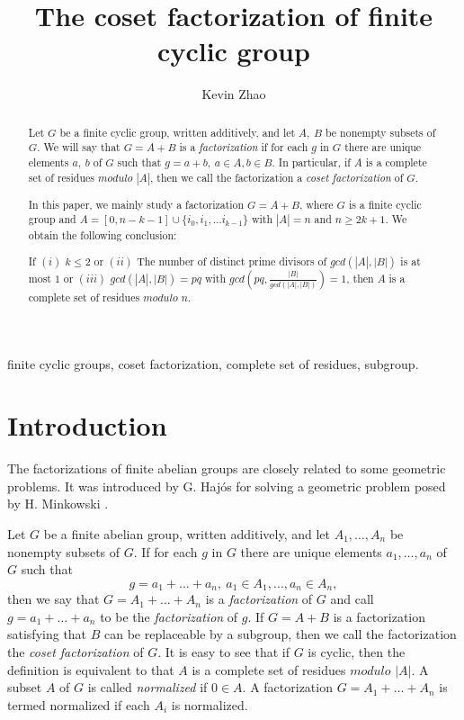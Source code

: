 \documentclass[preprint]{elsarticle}
\begin{document}
\begin{frontmatter}

\title{The coset factorization of finite cyclic group}

\author[mymainaddress]{Kevin Zhao}

\address[mymainaddress]{Department of Mathematics, South China normal university, Guangzhou 510631, China}

\begin{abstract}
Let $G$ be a finite cyclic group, written additively, and let $A,\ B$ be nonempty subsets of $G$.
We will say that $G= A+B$ is a \textit{factorization} if for each $g$ in $G$ there are unique elements $a,\ b$ of $G$ such that $g=a+b, \ a\in A, b\in B$.
In particular, if $A$ is a complete set of residues $modulo$ $|A|$,
then we call the factorization a \textit{coset factorization} of $G$.

In this paper, we mainly study a factorization $G= A+B$, where $G$ is a finite cyclic group and $A=[0,n-k-1]\cup\{i_0,i_1,\ldots i_{k-1}\}$
with $|A|=n$ and $n\geq 2k+1$.
We obtain the following conclusion:

If $(i)$ $k\leq 2$ or $(ii)$ The number of distinct prime divisors of $gcd(|A|,|B|)$ is at most $1$ or $(iii)$ $gcd(|A|,|B|)=pq$ with $gcd(pq,\frac{|B|}{gcd(|A|,|B|)})=1$,
then $A$ is a complete set of residues $modulo$ $n$.
\end{abstract}

\begin{keyword}
finite cyclic groups, coset factorization, complete set of residues, subgroup.
\end{keyword}

\end{frontmatter}

\section{Introduction}
The factorizations of finite abelian groups are closely related to some geometric problems.
It was introduced by G. Haj\'{o}s \cite{[GH]} for solving a geometric problem posed by H. Minkowski \cite{[HM]}.

Let $G$ be a finite abelian group, written additively, and let $A_1,\ldots,A_n$ be nonempty subsets of $G$.
If for each $g$ in $G$ there are unique elements $a_1,\ldots,a_n$ of $G$ such that
$$g= a_1 +\ldots+ a_n, \ a_1\in A_1,\ldots,a_n\in A_n,$$
then we say that $G= A_1+\ldots+A_n$ is a \textit{factorization} of $G$ and call $g= a_1 +\ldots+ a_n$ to be the \textit{factorization} of $g$.
If $G=A+B$ is a factorization satisfying that $B$ can be replaceable by a subgroup,
then we call the factorization the \textit{coset factorization} of $G$.
It is easy to see that if $G$ is cyclic, then the definition is equivalent to that
$A$ is a complete set of residues $modulo$ $|A|$.
A subset $A$ of $G$ is called \textit{normalized} if $0\in A$.
A factorization $G= A_1+\ldots+A_n$ is termed normalized if each $A_i$ is normalized.
\end{document}
